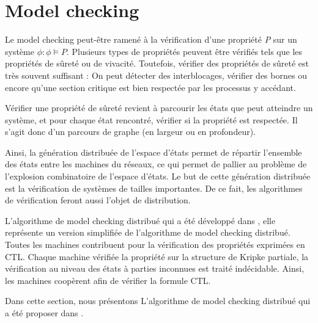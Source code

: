 \section{Model checking}\label{mcd}
Le model checking peut-être ramené à la vérification d'une propriété \emph{P} sur un système $\phi : \phi \models P$. Plusieurs types de propriétés peuvent être vérifiés tels que les propriétés de sûreté ou de vivacité. Toutefois, vérifier des propriétés de sûreté est très souvent suffisant : On peut détecter des interblocages, vérifier des bornes ou encore qu'une section critique est bien respectée par les processus y accédant. 


Vérifier une propriété de sûreté revient à parcourir les états que peut atteindre un système, et pour chaque état rencontré, vérifier si la propriété est respectée. Il s'agit donc d'un parcours de graphe (en largeur ou en profondeur).

Ainsi, la génération distribuée de l'espace d'états permet de répartir l'ensemble des états entre les machines du réseaux, ce qui permet de pallier au problème de l'explosion combinatoire de l'espace d'états. Le but de cette génération distribuée est la vérification de systèmes de tailles importantes. De ce fait, les algorithmes de vérification feront aussi l'objet de distribution. 

L'algorithme de model checking distribué qui a été développé dans \citep{depriester2011bouneb}, elle représente un version simplifiée de l'algorithme de model checking distribué. Toutes les machines contribuent pour la vérification des propriétés exprimées en CTL. Chaque machine vérifiée la propriété sur la structure de Kripke partiale, la vérification au niveau des états à parties inconnues est traité indécidable. Ainsi, les machines coopèrent afin de vérifier la formule CTL. 

Dans cette section, nous présentons L'algorithme de model checking distribué qui a été proposer dans \citep{depriester2011bouneb}.

